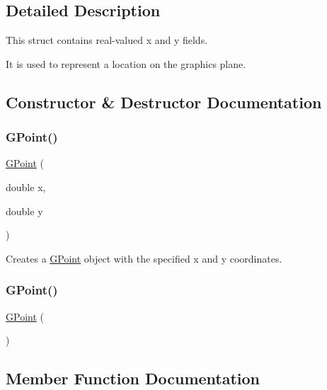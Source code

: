\subsection{Detailed Description}
This struct contains real-\/valued x and y fields. 

It is used to represent a location on the graphics plane. 

\subsection{Constructor \& Destructor Documentation}
\mbox{\label{structGPoint_af53a9d37dc824c0280f0cc05ae265f14}} 
\subsubsection{\texorpdfstring{G\+Point()}{GPoint()}\hspace{0.1cm}{\footnotesize\ttfamily [1/2]}}
{\footnotesize\ttfamily \mbox{\hyperlink{structGPoint}{G\+Point}} (\begin{DoxyParamCaption}\item[{double}]{x,  }\item[{double}]{y }\end{DoxyParamCaption})}



Creates a {\ttfamily \mbox{\hyperlink{structGPoint}{G\+Point}}} object with the specified {\ttfamily x} and {\ttfamily y} coordinates. 

\mbox{\label{structGPoint_a70204c3be75958419dddc2c8dc4a4805}} 
\subsubsection{\texorpdfstring{G\+Point()}{GPoint()}\hspace{0.1cm}{\footnotesize\ttfamily [2/2]}}
{\footnotesize\ttfamily \mbox{\hyperlink{structGPoint}{G\+Point}} (\begin{DoxyParamCaption}{ }\end{DoxyParamCaption})}



\subsection{Member Function Documentation}
\mbox{\label{structGPoint_a1fe5121d6528fdea3f243321b3fa3a49}} 
